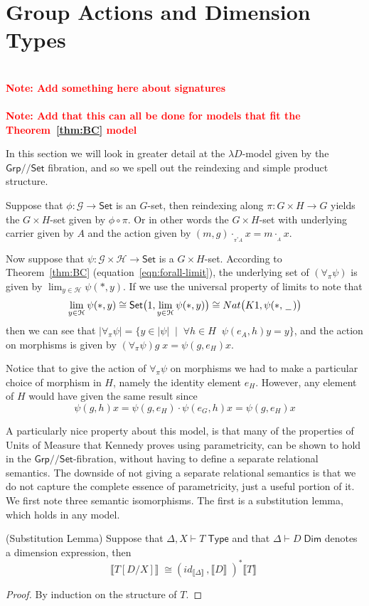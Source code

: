\documentclass[a4paper,UKenglish]{lipics}
\newcommand\note[1]{{ \bf \textcolor{red} {\vspace{2mm}\; \\ Note: #1\\}}}
\newcommand{\UoM}{Units of Measure\xspace}
\newcommand{\msf}[1]{\mathsf{#1}} %
\newcommand{\Grp}{\msf{Grp}}
\newcommand{\Set}{\msf{Set}}
\newcommand{\blank}{\, \underline{\hspace{2mm}} \,}
\newcommand{\act}[1]{\cdot_{_{#1}}}
\newcommand{\Lslice}[1]{#1/\!/\Set}
\newcommand{\GrpSet}{\Lslice{\Grp}}
\newcommand{\bbracket}[1]{\bigl( #1 \bigr)}
\newcommand{\sem}[1]{\ensuremath{\llbracket #1 \rrbracket} \;}
\newcommand{\Dj}[2]{#1 \vdash #2 \; \msf{ Dim}}
\newcommand{\Dim}{D}
\begin{document}
\section{Group Actions and Dimension Types}\label{sec:MonSet}
\note{Add something here about signatures}
\note{Add that this can all be done for models that fit the Theorem~\ref{thm:BC} model}

\noindent In this section we will look in greater detail at the $\lambda D$-model given by the $\GrpSet$ fibration, and so we spell out the reindexing and simple product structure.


Suppose that $\phi: \mathcal{G}\rightarrow \Set$ is an $G$-set, then reindexing along $\pi : G \times H \rightarrow G$ yields the $G \times H$-set given by $\phi \circ \pi$. Or in other words the $G \times H$-set with underlying carrier given by $A$ and the action given by $(m,g) \act{\pi^{\ast}A} x = m \act{A} x$.

Now suppose that $\psi : \mathcal{G} \times \mathcal{H} \rightarrow\Set $ is a $G \times H$-set. According to Theorem~\ref{thm:BC} (equation~\eqref{eqn:forall-limit}),
the underlying set of $ (\forall _\pi \psi)$ is given by $\lim_{y\in \mathcal{H}} \psi (\ast, y)$. If we use the universal property of limits to note that
\[
 \lim_{y\in \mathcal{H}} \psi (\ast, y) \cong \Set \bbracket{1, \lim_{y\in \mathcal{H}} \psi (\ast, y)} \cong Nat \bbracket{K1, \psi (\ast, \blank)}
\]
then we can see that $|\forall_\pi \psi | = \{y \in |\psi| \; \; | \; \; \forall h\in H \; \; \psi(e_A, h) y = y \}$, and the action on morphisms is given by $(\forall_\pi \psi) g \; x = \psi (g, e_H) x$.

Notice that to give the action of $\forall_\pi \psi$ on morphisms we had to make a particular choice of morphism in $H$, namely the identity element $e_H$. However, any element of $H$ would have given the same result since
\[
  \psi (g, h) x = \psi (g, e_H) \cdot \psi (e_G, h) x = \psi (g, e_H) x
\]


A particularly nice property about this model, is that many of the properties of \UoM that Kennedy proves using parametricity, can be shown to hold in the $\GrpSet$-fibration, without having to define a separate relational semantics. The downside of not giving a separate relational semantics is that we do not capture the complete essence of parametricity, just a useful portion of it. We first note three semantic isomorphisms. The first is a substitution lemma, which holds in any model.

\begin{lemma}(Substitution Lemma)
\label{lem:subst}
Suppose that $\Delta, X \vdash T \; \msf{ Type}$ and that $\Dj\Delta \Dim$ denotes a dimension expression, then
\[
 \sem{T[D/X]} \cong (id_{\sem{\Delta}} , \sem{D})^\ast \sem{T}
\]
\end{lemma}
\begin{proof}
 By induction on the structure of $T$.
\end{proof}
\end{document}
